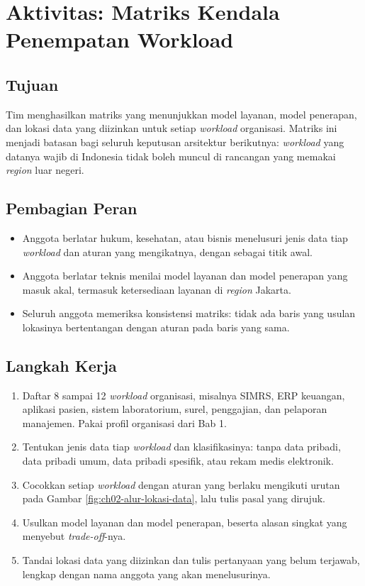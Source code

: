 \section{Aktivitas: Matriks Kendala Penempatan Workload}

\subsection*{Tujuan}

Tim menghasilkan matriks yang menunjukkan model layanan, model penerapan, dan lokasi data
yang diizinkan untuk setiap \textit{workload} organisasi. Matriks ini menjadi batasan bagi
seluruh keputusan arsitektur berikutnya: \textit{workload} yang datanya wajib di Indonesia
tidak boleh muncul di rancangan yang memakai \textit{region} luar negeri.

\subsection*{Pembagian Peran}

\begin{itemize}
  \item Anggota berlatar hukum, kesehatan, atau bisnis menelusuri jenis data tiap
        \textit{workload} dan aturan yang mengikatnya, dengan
         sebagai titik awal.
  \item Anggota berlatar teknis menilai model layanan dan model penerapan yang masuk akal,
        termasuk ketersediaan layanan di \textit{region} Jakarta.
  \item Seluruh anggota memeriksa konsistensi matriks: tidak ada baris yang usulan lokasinya
        bertentangan dengan aturan pada baris yang sama.
\end{itemize}

\subsection*{Langkah Kerja}

\begin{enumerate}
  \item Daftar 8 sampai 12 \textit{workload} organisasi, misalnya SIMRS, ERP keuangan,
        aplikasi pasien, sistem laboratorium, surel, penggajian, dan pelaporan manajemen.
        Pakai profil organisasi dari Bab 1.
  \item Tentukan jenis data tiap \textit{workload} dan klasifikasinya: tanpa data pribadi,
        data pribadi umum, data pribadi spesifik, atau rekam medis elektronik.
  \item Cocokkan setiap \textit{workload} dengan aturan yang berlaku mengikuti urutan pada
        Gambar \ref{fig:ch02-alur-lokasi-data}, lalu tulis pasal yang dirujuk.
  \item Usulkan model layanan dan model penerapan, beserta alasan singkat yang menyebut
        \textit{trade-off}-nya.
  \item Tandai lokasi data yang diizinkan dan tulis pertanyaan yang belum terjawab, lengkap
        dengan nama anggota yang akan menelusurinya.
\end{enumerate}


